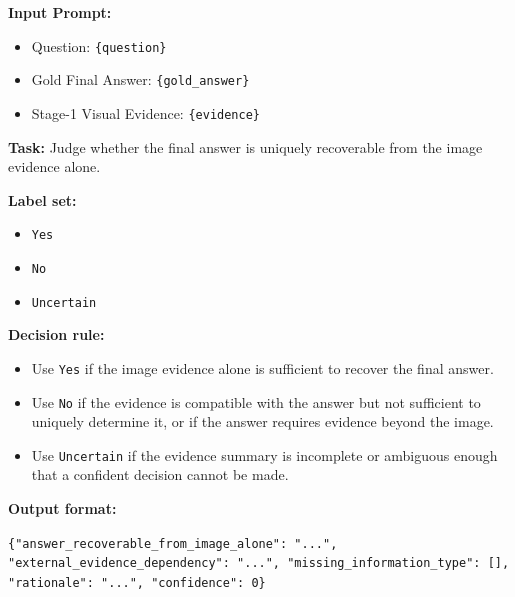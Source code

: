 \documentclass{article} %
\begin{document}
\begin{tcolorbox}[
  title=Example: $C_2$ External Evidence Dependency Prompt,
  coltitle=black,
  colbacktitle=blue!8,
  colback=blue!5,
  colframe=black,
  fonttitle=\bfseries,
  arc=2mm,
  boxrule=0.5pt,
  enhanced jigsaw,
  breakable,
  width=\linewidth,
  left=6pt,
  right=6pt,
  top=6pt,
  bottom=6pt
]

\textbf{Input Prompt:}

\begin{itemize}
  \item Question: \texttt{\{question\}}
  \item Gold Final Answer: \texttt{\{gold\_answer\}}
  \item Stage-1 Visual Evidence: \texttt{\{evidence\}}
\end{itemize}

\textbf{Task:}
Judge whether the final answer is uniquely recoverable from the image evidence alone.

\textbf{Label set:}
\begin{itemize}
  \item \texttt{Yes}
  \item \texttt{No}
  \item \texttt{Uncertain}
\end{itemize}

\textbf{Decision rule:}
\begin{itemize}
  \item Use \texttt{Yes} if the image evidence alone is sufficient to recover the final answer.
  \item Use \texttt{No} if the evidence is compatible with the answer but not sufficient to uniquely determine it, or if the answer requires evidence beyond the image.
  \item Use \texttt{Uncertain} if the evidence summary is incomplete or ambiguous enough that a confident decision cannot be made.
\end{itemize}

\textbf{Output format:}

\verb|{"answer_recoverable_from_image_alone": "...", "external_evidence_dependency": "...", "missing_information_type": [], "rationale": "...", "confidence": 0}|
\end{tcolorbox}
\end{document}

